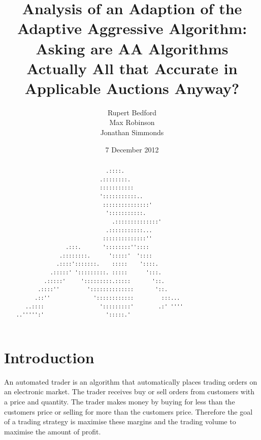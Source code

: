 \documentclass{acm_proc_article-sp}
\begin{document}
\title{Analysis of an Adaption of the Adaptive Aggressive Algorithm: Asking are AA Algorithms Actually All that Accurate in Applicable Auctions Anyway?}
\author{
  \alignauthor
    Rupert Bedford\\
  \alignauthor
    Max Robinson\\
  \alignauthor
    Jonathan Simmonds
}
\date{7 December 2012}

\maketitle
\begin{abstract} \label{sec:abstract}
\begin{verbatim}
                             .::::. 
                           .::::::::. 
                           ::::::::::: 
                           ':::::::::::.. 
                            :::::::::::::::' 
                             ':::::::::::. 
                               .::::::::::::::' 
                             .:::::::::::... 
                            ::::::::::::::'' 
                .:::.       '::::::::'':::: 
              .::::::::.      ':::::'  ':::: 
             .::::':::::::.    :::::    '::::. 
           .:::::' ':::::::::. :::::      ':::. 
         .:::::'     ':::::::::.:::::       '::. 
       .::::''         '::::::::::::::       '::. 
      .::''              '::::::::::::         :::... 
   ..::::                  ':::::::::'        .:' '''' 
..''''':'                    ':::::.' 
\end{verbatim}
\end{abstract}

\pagebreak

\section{Introduction} \label{sec:introduction}

An automated trader is an algorithm that automatically places trading orders on
an electronic market.
The trader receives buy or sell orders from customers with a price and
quantity.
The trader makes money by buying for less than the customers price or selling
for more than the customers price.
Therefore the goal of a trading strategy is maximise these margins and the
trading volume to maximise the amount of profit.
\end{document}
